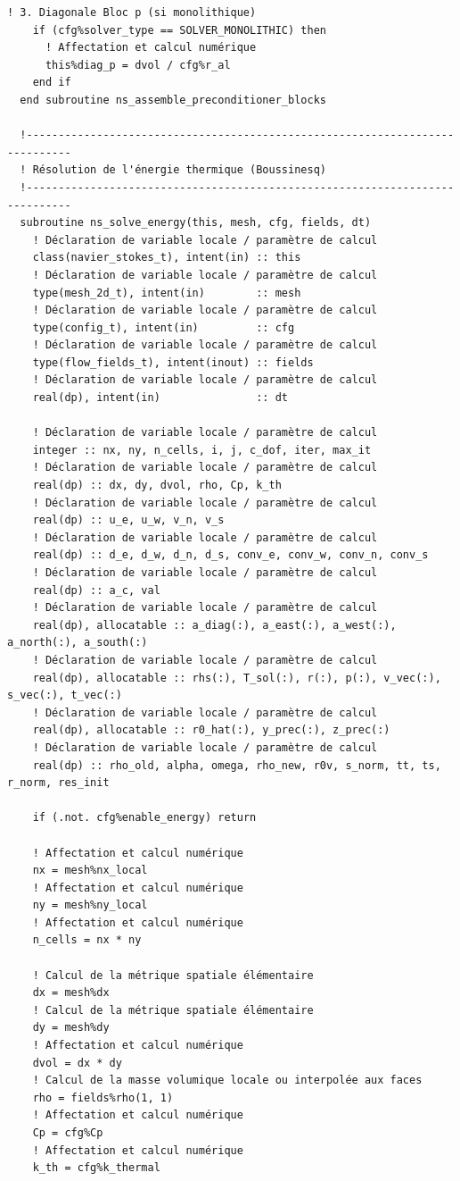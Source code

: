 \documentclass[10pt,a4paper,oneside]{book}
\begin{document}
\begin{lstlisting}[language={[95]Fortran}]
    ! 3. Diagonale Bloc p (si monolithique)
    if (cfg%solver_type == SOLVER_MONOLITHIC) then
      ! Affectation et calcul numérique
      this%diag_p = dvol / cfg%r_al
    end if
  end subroutine ns_assemble_preconditioner_blocks

  !-----------------------------------------------------------------------------
  ! Résolution de l'énergie thermique (Boussinesq)
  !-----------------------------------------------------------------------------
  subroutine ns_solve_energy(this, mesh, cfg, fields, dt)
    ! Déclaration de variable locale / paramètre de calcul
    class(navier_stokes_t), intent(in) :: this
    ! Déclaration de variable locale / paramètre de calcul
    type(mesh_2d_t), intent(in)        :: mesh
    ! Déclaration de variable locale / paramètre de calcul
    type(config_t), intent(in)         :: cfg
    ! Déclaration de variable locale / paramètre de calcul
    type(flow_fields_t), intent(inout) :: fields
    ! Déclaration de variable locale / paramètre de calcul
    real(dp), intent(in)               :: dt

    ! Déclaration de variable locale / paramètre de calcul
    integer :: nx, ny, n_cells, i, j, c_dof, iter, max_it
    ! Déclaration de variable locale / paramètre de calcul
    real(dp) :: dx, dy, dvol, rho, Cp, k_th
    ! Déclaration de variable locale / paramètre de calcul
    real(dp) :: u_e, u_w, v_n, v_s
    ! Déclaration de variable locale / paramètre de calcul
    real(dp) :: d_e, d_w, d_n, d_s, conv_e, conv_w, conv_n, conv_s
    ! Déclaration de variable locale / paramètre de calcul
    real(dp) :: a_c, val
    ! Déclaration de variable locale / paramètre de calcul
    real(dp), allocatable :: a_diag(:), a_east(:), a_west(:), a_north(:), a_south(:)
    ! Déclaration de variable locale / paramètre de calcul
    real(dp), allocatable :: rhs(:), T_sol(:), r(:), p(:), v_vec(:), s_vec(:), t_vec(:)
    ! Déclaration de variable locale / paramètre de calcul
    real(dp), allocatable :: r0_hat(:), y_prec(:), z_prec(:)
    ! Déclaration de variable locale / paramètre de calcul
    real(dp) :: rho_old, alpha, omega, rho_new, r0v, s_norm, tt, ts, r_norm, res_init

    if (.not. cfg%enable_energy) return

    ! Affectation et calcul numérique
    nx = mesh%nx_local
    ! Affectation et calcul numérique
    ny = mesh%ny_local
    ! Affectation et calcul numérique
    n_cells = nx * ny

    ! Calcul de la métrique spatiale élémentaire
    dx = mesh%dx
    ! Calcul de la métrique spatiale élémentaire
    dy = mesh%dy
    ! Affectation et calcul numérique
    dvol = dx * dy
    ! Calcul de la masse volumique locale ou interpolée aux faces
    rho = fields%rho(1, 1)
    ! Affectation et calcul numérique
    Cp = cfg%Cp
    ! Affectation et calcul numérique
    k_th = cfg%k_thermal


\end{lstlisting}
\end{document}
